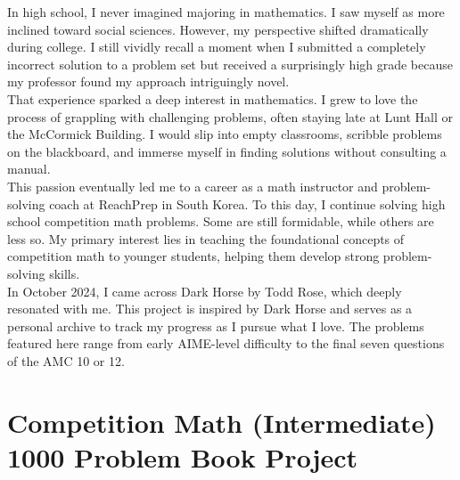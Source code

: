 \documentclass[12pt]{article}
\begin{document}
\begin{flushleft}
In high school, I never imagined majoring in mathematics. I saw myself as more inclined toward social sciences. However, my perspective shifted dramatically during college. I still vividly recall a moment when I submitted a completely incorrect solution to a problem set but received a surprisingly high grade because my professor found my approach intriguingly novel.\\
\bigskip
That experience sparked a deep interest in mathematics. I grew to love the process of grappling with challenging problems, often staying late at Lunt Hall or the McCormick Building. I would slip into empty classrooms, scribble problems on the blackboard, and immerse myself in finding solutions without consulting a manual.\\
\bigskip
This passion eventually led me to a career as a math instructor and problem-solving coach at ReachPrep in South Korea. To this day, I continue solving high school competition math problems. Some are still formidable, while others are less so. My primary interest lies in teaching the foundational concepts of competition math to younger students, helping them develop strong problem-solving skills.\\
\bigskip
In October 2024, I came across Dark Horse by Todd Rose, which deeply resonated with me. This project is inspired by Dark Horse and serves as a personal archive to track my progress as I pursue what I love. The problems featured here range from early AIME-level difficulty to the final seven questions of the AMC 10 or 12.\\
\newpage


\section*{Competition Math (Intermediate) 1000 Problem Book Project}




\end{flushleft}
\end{document}
